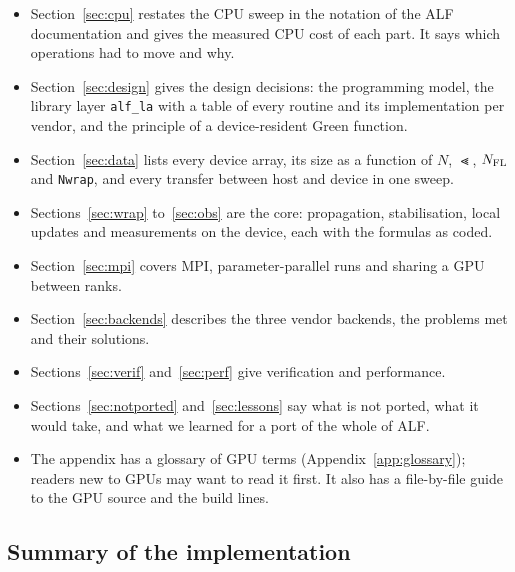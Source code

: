 \begin{itemize}
\item Section~\ref{sec:cpu} restates the CPU sweep in the notation of the ALF documentation and gives the measured CPU cost of each part. It says which operations had to move and why.
\item Section~\ref{sec:design} gives the design decisions: the programming model, the library layer \texttt{alf\_la} with a table of every routine and its implementation per vendor, and the principle of a device-resident Green function.
\item Section~\ref{sec:data} lists every device array, its size as a function of $N$, $\Lt$, $N_{\rm FL}$ and \texttt{Nwrap}, and every transfer between host and device in one sweep.
\item Sections~\ref{sec:wrap} to~\ref{sec:obs} are the core: propagation, stabilisation, local updates and measurements on the device, each with the formulas as coded.
\item Section~\ref{sec:mpi} covers MPI, parameter-parallel runs and sharing a GPU between ranks.
\item Section~\ref{sec:backends} describes the three vendor backends, the problems met and their solutions.
\item Sections~\ref{sec:verif} and~\ref{sec:perf} give verification and performance.
\item Sections~\ref{sec:notported} and~\ref{sec:lessons} say what is not ported, what it would take, and what we learned for a port of the whole of ALF.
\item The appendix has a glossary of GPU terms (Appendix~\ref{app:glossary}); readers new to GPUs may want to read it first. It also has a file-by-file guide to the GPU source and the build lines.
\end{itemize}

\subsection{Summary of the implementation}

